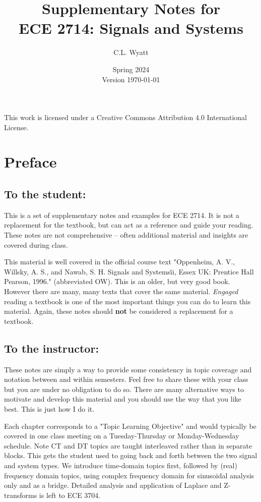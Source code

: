 \documentclass[]{book}
\theoremstyle{definition}
\numberwithin{section}{chapter}
\numberwithin{equation}{chapter}
\begin{document}
\frontmatter

\title{Supplementary Notes for\\ ECE 2714: Signals and Systems}
\author{C.L. Wyatt}
\date{Spring 2024\\Version \today}
\maketitle
This work is licensed under a Creative Commons Attribution 4.0 International License.

\chapter*{Preface}

\section*{To the student:}
This is a set of supplementary notes and examples for ECE 2714. It is not a replacement for the textbook, but can act as a reference and guide your reading. These notes are not comprehensive -- often additional material and insights are covered during class.

This material is well covered in the official course text "Oppenheim, A. V., Willsky, A. S., and Nawab, S. H. Signals and Systems\. ii, Essex UK: Prentice Hall Pearson, 1996." \cite{OW} (abbreviated OW). This is an older, but very good book. However there are many, many texts that cover the same material. \textit{Engaged} reading a textbook is one of the most important things you can do to learn this material. Again, these notes should \textbf{not} be considered a replacement for a textbook.

\section*{To the instructor:}
These notes are simply a way to provide some consistency in topic coverage and notation between and within semesters. Feel free to share these with your class but you are under no obligation to do so. There are many alternative ways to motivate and develop this material and you should use the way that you like best. This is just how I do it.

Each chapter corresponds to a "Topic Learning Objective" and would typically be covered in one class meeting on a Tuesday-Thursday or Monday-Wednesday schedule. Note CT and DT topics are taught interleaved rather than in separate blocks. This gets the student used to going back and forth between the two signal and system types. We introduce time-domain topics first, followed by (real) frequency domain topics, using complex frequency domain for sinusoidal analysis only and as a bridge. Detailed analysis and application of Laplace and Z-transforms is left to ECE 3704. 
\end{document}
